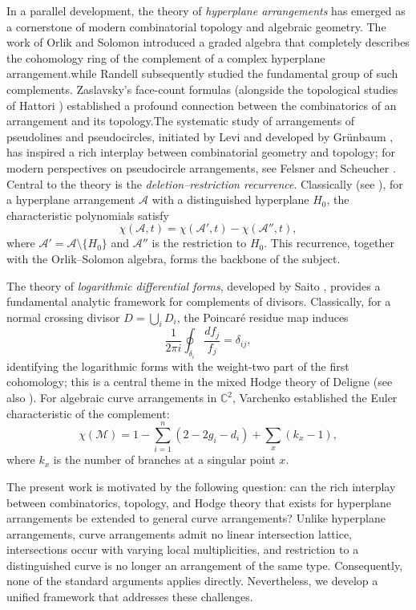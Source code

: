 \documentclass[article,11pt]{amsart} \numberwithin{equation}{section}
\numberwithin{equation}{section}
\begin{document}
{In a parallel development, the theory of \emph{hyperplane arrangements} has emerged as a cornerstone of modern combinatorial topology and algebraic geometry. The work of Orlik and Solomon \cite{OrlikSolomon} introduced a graded algebra that completely describes the cohomology ring of the complement of a complex hyperplane arrangement.while Randell \cite{Randell1989} subsequently studied the fundamental group of such complements. Zaslavsky's face-count formulas \cite{Zaslavsky75}(alongside the topological studies of Hattori \cite{Hattori1975}) established a profound connection between the combinatorics of an arrangement and its topology.The systematic study of arrangements of pseudolines and pseudocircles, initiated by Levi \cite{Levi26} and developed by Gr\"unbaum \cite{Grunbaum72}, has inspired a rich interplay between combinatorial geometry and topology; for modern perspectives on pseudocircle arrangements, see Felsner and Scheucher \cite{Felsner21}. Central to the theory is the \emph{deletion--restriction recurrence}. Classically (see \cite[Theorem 2.7]{dimca}), for a hyperplane arrangement $\mathcal A$ with a distinguished hyperplane $H_0$, the characteristic polynomials satisfy
\[
\chi(\mathcal A,t)=\chi(\mathcal A',t)-\chi(\mathcal A'',t),
\]
where $\mathcal A'=\mathcal A\setminus\{H_0\}$ and $\mathcal A''$ is the restriction to $H_0$. This recurrence, together with the Orlik--Solomon algebra, forms the backbone of the subject.

The theory of \emph{logarithmic differential forms}, developed by Saito \cite{Saito80}, provides a fundamental analytic framework for complements of divisors. Classically, for a normal crossing divisor $D=\bigcup_i D_i$, the Poincar\'e residue map induces
\[
\frac{1}{2\pi i}\oint_{\delta_i}\frac{df_j}{f_j}=\delta_{ij},
\]
identifying the logarithmic forms with the weight-two part of the first cohomology; this is a central theme in the mixed Hodge theory of Deligne \cite{Deligne71, Deligne74} (see also \cite{GriffithsHarris, Voisin}). For algebraic curve arrangements in $\mathbb C^2$, Varchenko \cite{Varchenko82} established the Euler characteristic of the complement:
\[
\chi(\mathcal M)=1-\sum_{i=1}^n(2-2g_i-d_i)+\sum_x(k_x-1),
\]
where $k_x$ is the number of branches at a singular point $x$.

The present work is motivated by the following question: can the rich interplay between combinatorics, topology, and Hodge theory that exists for hyperplane arrangements be extended to general curve arrangements? Unlike hyperplane arrangements, curve arrangements admit no linear intersection lattice, intersections occur with varying local multiplicities, and restriction to a distinguished curve is no longer an arrangement of the same type. Consequently, none of the standard arguments applies directly. Nevertheless, we develop a unified framework that addresses these challenges.

}
\end{document}
